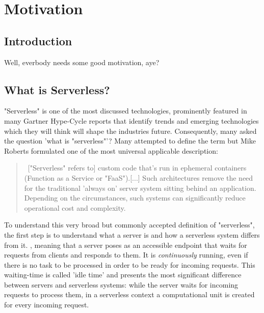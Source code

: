 \chapter{Motivation}


\section{Introduction}

Well, everbody needs some good motivation, aye?

\section{What is Serverless?}\label{sec:whatIsServerless}

"Serverless" is one of the most discussed technologies, prominently featured in many Gartner Hype-Cycle reports that identify trends and emerging technologies which they will think will shape the industries future. 
\autocite{Smith2017Hype2017}
\autocite{Weiss2017Hype2017}
\autocite{Natis2017Hype2017}
\autocite{Walker2017Hype2017}
\autocite{DawsonPhilip2017Hype2017}
Consequently, many asked the question 'what is "serverless"'? Many attempted to define the term but Mike Roberts formulated one of the most universal applicable description:  

\blockquote{\guillemotleft \ ["Serverless" refers to] custom code that's run in ephemeral containers (Function as a Service or "FaaS").[...] Such architectures remove the need for the traditional 'always on' server system sitting behind an application. Depending on the circumstances, such systems can significantly reduce operational cost and complexity. \guillemotright\autocite{Roberts2016ServerlessArchitectures}}

To understand this very broad but commonly accepted definition of "serverless", the first step is to understand what a server is and how a serverless system differs from it. \autocite{TheServer}, meaning that a server poses as an accessible endpoint that waits for requests from clients and responds to them. It is \textit{continuously} running, even if there is no task to be processed in order to be ready for incoming requests. This waiting-time is called 'idle time' and presents the most significant difference between servers and serverless systems: while the server waits for incoming requests to process them, in a serverless context a computational unit is created for every incoming request.

